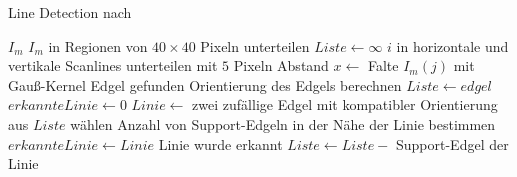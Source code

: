 \begin{algorithm}[!ht]\small
\caption{Line Detection nach \citeauthor{clarke96}}
\label{alg:linedetection-clarke-overview}
\begin{algorithmic}[1]
	\Require $I_m$
	\State $I_m$ in Regionen von $40 \times 40$ Pixeln unterteilen
			\State $Liste \gets \infty$
			\State $i$ in horizontale und vertikale Scanlines unterteilen mit $5$ Pixeln Abstand
				\State $x \gets$ Falte $I_m\left(j\right)$ mit Gauß-Kernel
					\Comment Edgel gefunden
					\State Orientierung des Edgels berechnen
					\State $Liste \gets edgel$
				\EndIf
			\EndFor
				\State $erkannteLinie \gets 0$
					\State $Linie \gets$ zwei zufällige Edgel mit kompatibler Orientierung aus $Liste$ wählen
					\State Anzahl von Support-Edgeln in der Nähe der Linie bestimmen
						\State $erkannteLinie \gets Linie$
					\EndIf
				\EndFor
					\Comment Linie wurde erkannt
					\State $Liste \gets Liste -$ Support-Edgel der Linie
				\EndIf
			\EndWhile
		\EndFor
	\end{algorithmic}
\end{algorithm}

